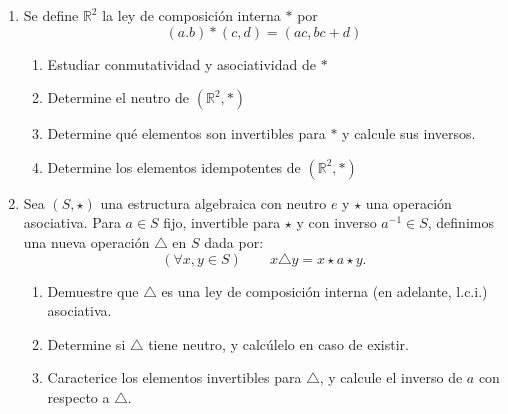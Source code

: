 \documentclass[letterpaper,10pt]{article}
\newcommand{\R}{\mathbb R}
\theoremstyle{plain}
\begin{document}
\begin{enumerate}[\bf P1.]
    \item Se define $\R^{2}$ la ley de composición interna $*$ por
    $$ (a.b)*(c,d)=(ac,bc+d) $$
    \begin{enumerate}
        \item Estudiar conmutatividad y asociatividad de $*$
        \item Determine el neutro de $(\R^{2},*)$
        \item Determine qué elementos son invertibles para $*$ y calcule sus inversos.
        \item Determine los elementos idempotentes de $(\R^{2},*)$
    \end{enumerate}
    
    \item Sea $(S,\star)$ una estructura algebraica con neutro $e$ y $\star$ una operación asociativa. Para $a\in S$ fijo, invertible para $\star$ y con inverso $a^{-1}\in S$, definimos una nueva operación $\triangle$ en $S$ dada por: $$(\forall x,y\in S)\quad\quad x\triangle y = x\star a \star y.$$
    \begin{enumerate}
	    \item Demuestre que $\triangle$ es una ley de composición interna (en adelante, l.c.i.) asociativa.
	    \item Determine si $\triangle$ tiene neutro, y calcúlelo en caso de existir.
	    \item Caracterice los elementos invertibles para $\triangle$, y calcule el inverso de $a$ con respecto a $\triangle$.
    \end{enumerate}


\end{enumerate}
\end{document}
